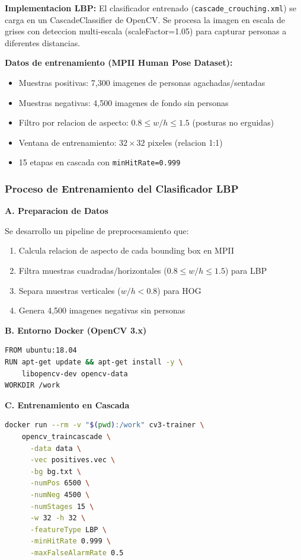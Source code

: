 \documentclass[conference]{IEEEtran}
\begin{document}
\textbf{Implementacion LBP:} El clasificador entrenado (\texttt{cascade\_crouching.xml}) se carga en un CascadeClassifier de OpenCV. Se procesa la imagen en escala de grises con deteccion multi-escala (scaleFactor=1.05) para capturar personas a diferentes distancias.

\textbf{Datos de entrenamiento (MPII Human Pose Dataset):}
\begin{itemize}
    \item Muestras positivas: 7,300 imagenes de personas agachadas/sentadas
    \item Muestras negativas: 4,500 imagenes de fondo sin personas
    \item Filtro por relacion de aspecto: $0.8 \leq w/h \leq 1.5$ (posturas no erguidas)
    \item Ventana de entrenamiento: $32 \times 32$ pixeles (relacion 1:1)
    \item 15 etapas en cascada con \texttt{minHitRate=0.999}
\end{itemize}

\subsubsection{Proceso de Entrenamiento del Clasificador LBP}

\textbf{A. Preparacion de Datos}

Se desarrollo un pipeline de preprocesamiento que:
\begin{enumerate}
    \item Calcula relacion de aspecto de cada bounding box en MPII
    \item Filtra muestras cuadradas/horizontales ($0.8 \leq w/h \leq 1.5$) para LBP
    \item Separa muestras verticales ($w/h < 0.8$) para HOG
    \item Genera 4,500 imagenes negativas sin personas
\end{enumerate}

\textbf{B. Entorno Docker (OpenCV 3.x)}

\begin{lstlisting}[caption={Dockerfile para entrenamiento},label={lst:dockerfile},language=bash]
FROM ubuntu:18.04
RUN apt-get update && apt-get install -y \
    libopencv-dev opencv-data
WORKDIR /work
\end{lstlisting}

\textbf{C. Entrenamiento en Cascada}

\begin{lstlisting}[caption={Comando de entrenamiento LBP},label={lst:traincmd},language=bash]
docker run --rm -v "$(pwd):/work" cv3-trainer \
    opencv_traincascade \
      -data data \
      -vec positives.vec \
      -bg bg.txt \
      -numPos 6500 \
      -numNeg 4500 \
      -numStages 15 \
      -w 32 -h 32 \
      -featureType LBP \
      -minHitRate 0.999 \
      -maxFalseAlarmRate 0.5
\end{lstlisting}
\end{document}
